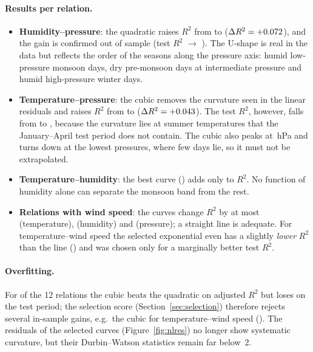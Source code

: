 \documentclass[11pt,a4paper]{article}
\newcommand{\Rsq}{R^2}
\begin{document}
\paragraph{Results per relation.}
\begin{itemize}
  \item \textbf{Humidity--pressure}: the quadratic raises $\Rsq$ from \RlinHP{} to
        \RbestHP{} ($\Delta\Rsq=\gainHP$), and the gain is confirmed out of sample
        (test $\Rsq$ \RlinTestHP{} $\rightarrow$ \RbestTestHP). The U-shape is real in the
        data but reflects the order of the seasons along the pressure axis: humid
        low-pressure monsoon days, dry pre-monsoon days at intermediate pressure and
        humid high-pressure winter days.
  \item \textbf{Temperature--pressure}: the cubic removes the curvature seen in the linear
        residuals and raises $\Rsq$ from \RlinTP{} to \RbestTP{} ($\Delta\Rsq=\gainTP$).
        The test $\Rsq$, however, falls from \RlinTestTP{} to \RbestTestTP, because the
        curvature lies at summer temperatures that the January--April test period does
        not contain. The cubic also peaks at \cubicPeakTP\,hPa and turns down at the lowest
        pressures, where few days lie, so it must not be extrapolated.
  \item \textbf{Temperature--humidity}: the best curve (\bestTH) adds only \gainTH{} to
        $\Rsq$. No function of humidity alone can separate the monsoon band from the rest.
  \item \textbf{Relations with wind speed}: the curves change $\Rsq$ by at most
        \maxGainTW{} (temperature), \maxGainHW{} (humidity) and \maxGainWP{} (pressure);
        a straight line is adequate. For temperature--wind speed the selected exponential
        even has a slightly \emph{lower} $\Rsq$ than the line (\gainTW) and was chosen only
        for a marginally better test $\Rsq$.
\end{itemize}

\paragraph{Overfitting.} For \nOverfit{} of the 12 relations the cubic beats the
quadratic on adjusted $\Rsq$ but loses on the test period; the selection score
(Section~\ref{sec:selection}) therefore rejects several in-sample gains, e.g.\ the
cubic for temperature--wind speed (\maxGainTW). The residuals of the selected curves
(Figure~\ref{fig:nlres}) no longer show systematic curvature, but their Durbin--Watson
statistics remain far below~2.
\end{document}
